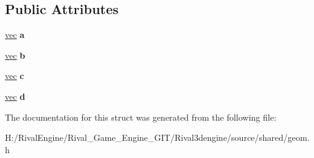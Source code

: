\subsection*{Public Attributes}
\begin{DoxyCompactItemize}
\item 
\mbox{\label{structmatrix4x3_afd3a9cf167dc16936d1c1266457636fd}} 
\hyperlink{structvec}{vec} {\bfseries a}
\item 
\mbox{\label{structmatrix4x3_a4f2f97c99e7f0012001be047461fd800}} 
\hyperlink{structvec}{vec} {\bfseries b}
\item 
\mbox{\label{structmatrix4x3_a88c07ab1704d1701bb36a78299b7f908}} 
\hyperlink{structvec}{vec} {\bfseries c}
\item 
\mbox{\label{structmatrix4x3_ac422a9092203335b414f4b66918beb50}} 
\hyperlink{structvec}{vec} {\bfseries d}
\end{DoxyCompactItemize}


The documentation for this struct was generated from the following file\+:\begin{DoxyCompactItemize}
\item 
H\+:/\+Rival\+Engine/\+Rival\+\_\+\+Game\+\_\+\+Engine\+\_\+\+G\+I\+T/\+Rival3dengine/source/shared/geom.\+h\end{DoxyCompactItemize}

